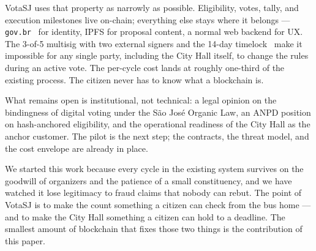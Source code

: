\documentclass[12pt]{article}
\begin{document}
VotaSJ uses that property as narrowly as possible. Eligibility, votes,
tally, and execution milestones live on-chain; everything else stays
where it belongs --- \texttt{gov.br}~\cite{govbrmanual} for identity,
IPFS for proposal content, a normal web backend for UX. The 3-of-5
multisig with two external signers and the 14-day
timelock~\cite{openzeppelin5} make it impossible for any single party,
including the City Hall itself, to change the rules during an active
vote. The per-cycle cost lands at roughly one-third of the existing
process. The citizen never has to know what a blockchain is.

What remains open is institutional, not technical: a legal opinion on
the bindingness of digital voting under the S\~ao Jos\'e Organic Law,
an ANPD position on hash-anchored eligibility, and the operational
readiness of the City Hall as the anchor customer. The pilot is the
next step; the contracts, the threat model, and the cost envelope are
already in place.

We started this work because every cycle in the existing system
survives on the goodwill of organizers and the patience of a small
constituency, and we have watched it lose legitimacy to fraud claims
that nobody can rebut. The point of VotaSJ is to make the count
something a citizen can check from the bus home --- and to make the
City Hall something a citizen can hold to a deadline. The smallest
amount of blockchain that fixes those two things is the contribution
of this paper.



\end{document}
